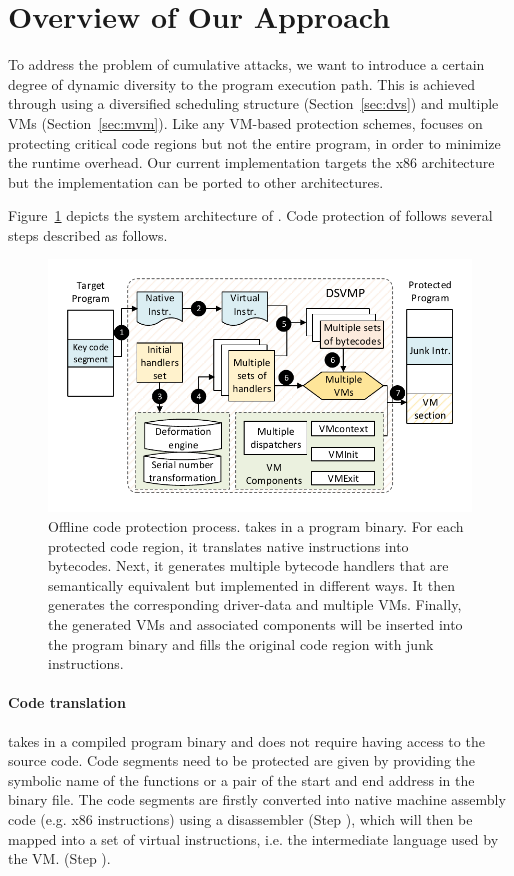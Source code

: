 \section{Overview of Our Approach}\label{sec:overview}
To address the problem of cumulative attacks, we want to introduce a certain
degree of dynamic diversity to the program execution path. This is achieved
through using a diversified scheduling structure (Section~\ref {sec:dvs}) and
multiple VMs (Section~\ref {sec:mvm}). Like any VM-based protection schemes,
\DSVMP focuses on protecting critical code regions but not the entire program, in order to minimize the runtime overhead.
Our current implementation targets the x86 architecture but the implementation can be
ported to other architectures.


Figure~\ref{fig:Fig.overview} depicts the system architecture of \DSVMP.
Code protection of \DSVMP follows several steps described as follows.

\begin{figure}[!t]
  \centering
  \includegraphics[width=0.7\columnwidth]{figure/figoverview.pdf}
  \caption{Offline code protection process. \DSVMP takes in a program binary. For each protected code region, it translates native instructions into bytecodes. Next, it generates multiple bytecode handlers that are semantically equivalent but implemented in different ways. It then generates the corresponding driver-data and multiple VMs. Finally, the generated VMs and associated components will be inserted into the program binary and fills the original code region with junk instructions.}\label{fig:Fig.overview}
\end{figure}

\paragraph*{Code translation} \DSVMP takes in a compiled program binary and
does not require having access to the source code. Code segments need to be
protected are given by providing the symbolic name of the functions or a pair
of the start and end address in the binary file. The code segments are
firstly converted into native machine assembly code (e.g. x86 instructions)
using a disassembler (Step ), which will then be mapped into a set of virtual instructions, i.e. 
the intermediate language used by the VM.
(Step ).

